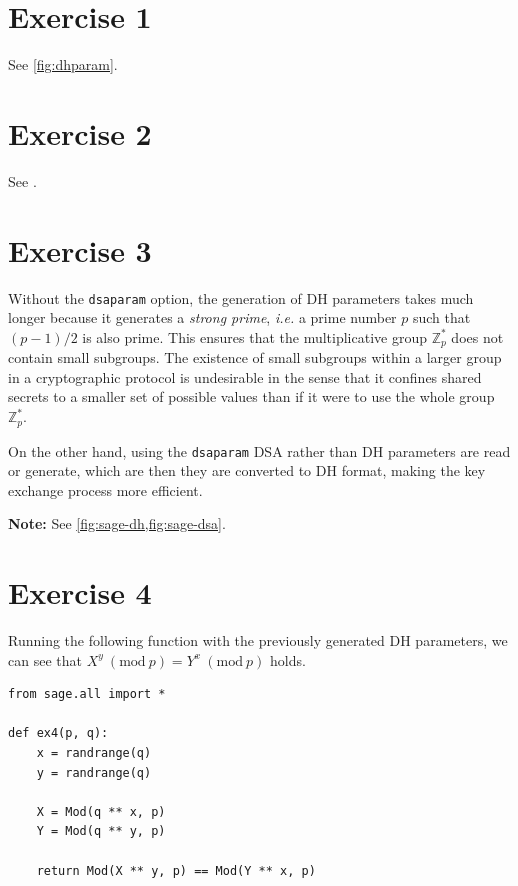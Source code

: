 \documentclass[a4paper]{article}
\begin{document}
\section*{Exercise 1}

See \cref{fig:dhparam}.

\section*{Exercise 2}

See .

\section*{Exercise 3}

Without the \texttt{dsaparam} option, the generation of DH parameters takes much longer because it
generates a \textit{strong prime}, \textit{i.e.} a prime number $p$ such that $(p-1)/2$ is also prime.
This ensures that the multiplicative group $\mathbb{Z}_p^\ast$ does not contain small subgroups. The
existence of small subgroups within a larger group in a cryptographic protocol is undesirable in the
sense that it confines shared secrets to a smaller set of possible values than if it were to use the
whole group $\mathbb{Z}_p^\ast$. 

On the other hand, using the \texttt{dsaparam} DSA rather than DH parameters are read or generate, which
are then they are converted to DH format, making the key exchange process more efficient.

\vspace{\baselineskip}

\textbf{Note:} See \cref{fig:sage-dh,fig:sage-dsa}.

\section*{Exercise 4}

Running the following function with the previously generated DH parameters, we can see that
$X^y \ (\mathrm{mod} \ p) = Y^x \ (\mathrm{mod} \ p)$ holds.

\vspace{\baselineskip}

\begin{verbatim}
from sage.all import *

def ex4(p, q):
    x = randrange(q)
    y = randrange(q)

    X = Mod(q ** x, p)
    Y = Mod(q ** y, p)

    return Mod(X ** y, p) == Mod(Y ** x, p)
\end{verbatim}
\end{document}
